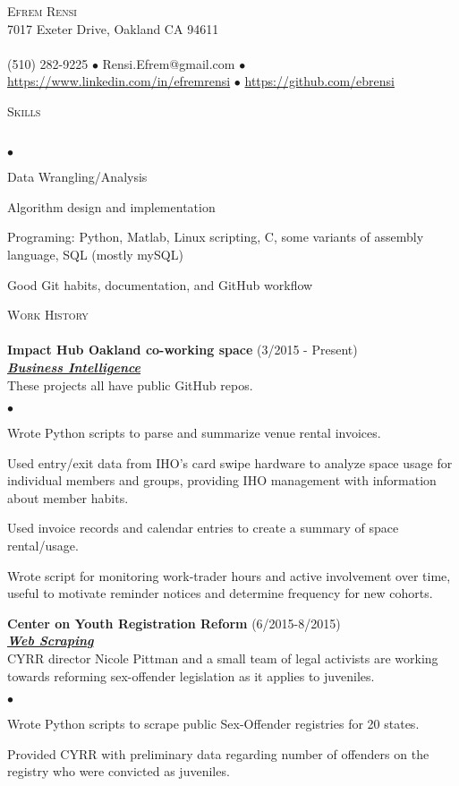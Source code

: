 \documentclass{article}
\newcommand{\lineunder}{\vspace*{-8pt} \\ \hspace*{-18pt} \hrulefill \\}
\newcommand{\header}[1]{{\hspace*{-15pt}\vspace*{6pt} \textsc{#1}} \vspace*{-6pt} \lineunder}
\newcommand{\employer}[3]{{ \textbf{#1} (#2)\\ \underline{\textbf{\emph{#3}}}\\  }}
\newcommand{\contact}[3]{
\vspace*{-8pt}
\begin{center}
{\LARGE \scshape {#1}}\\
#2 \lineunder
#3
\end{center}
\vspace*{-8pt}
}
\newenvironment{achievements}{\begin{list}{$\bullet$}{\topsep 0pt \itemsep -2pt}}{\vspace*{4pt}\end{list}}
\begin{document}
\small
\smallskip
\vspace*{-44pt}

\contact{Efrem Rensi}
{7017 Exeter Drive, Oakland CA 94611}
{(510) 282-9225 $\bullet$ Rensi.Efrem@gmail.com  $\bullet$ \url{https://www.linkedin.com/in/efremrensi}
$\bullet$ \url{https://github.com/ebrensi}
}
\bigskip

\medskip
\header{Skills}
\begin{achievements}
\item Data Wrangling/Analysis
\item Algorithm design and implementation
\item Programing: Python, Matlab, Linux scripting, C, some variants of assembly language, SQL (mostly mySQL)
\item Good Git habits, documentation, and GitHub workflow
\end{achievements}
\medskip

\header{Work History}
\employer{Impact Hub Oakland co-working space}{3/2015 - Present}{Business Intelligence}
These projects all have public GitHub repos.
\begin{achievements}
\item Wrote Python scripts to parse and summarize venue rental invoices.
\item Used entry/exit data from IHO's card swipe hardware to analyze space usage for individual members and groups, providing IHO management with information about member habits.
\item Used invoice records and calendar entries to create a summary of space rental/usage.
\item Wrote script for monitoring work-trader hours and active involvement over time, useful to motivate reminder notices and determine frequency for new cohorts.
\end{achievements}

\employer{Center on Youth Registration Reform}{6/2015-8/2015}{Web Scraping}
 CYRR director Nicole Pittman and a small team of legal activists are working towards reforming sex-offender legislation as it applies to juveniles.
\begin{achievements}
\item Wrote Python scripts to scrape public Sex-Offender registries for 20 states.
\item Provided  CYRR with preliminary data regarding number of offenders on the registry who were convicted as juveniles.
\end{achievements}
\end{document}
